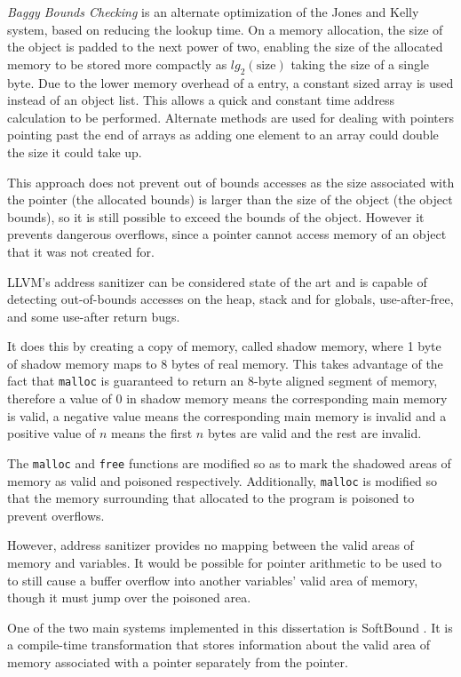 \textit{Baggy Bounds Checking} \cite{akritidis2009baggy} is an alternate optimization of the Jones and Kelly system, based on reducing the lookup time.
On a memory allocation, the size of the object is padded to the next power of two, enabling the size of the allocated memory to be stored more compactly as $lg_2(\mbox{size})$ taking the size of a single byte.
Due to the lower memory overhead of a entry, a constant sized array is used instead of an object list.
This allows a quick and constant time address calculation to be performed.
Alternate methods are used for dealing with pointers pointing past the end of arrays as adding one element to an array could double the size it could take up.

This approach does not prevent out of bounds accesses as the size associated with the pointer (the allocated bounds) is larger than the size of the object (the object bounds), so it is still possible to exceed the bounds of the object.
However it prevents dangerous overflows, since a pointer cannot access memory of an object that it was not created for.

LLVM's address sanitizer \cite{llvmAddrSan, llvmAddrSanAlgo} can be considered state of the art and  is capable of detecting out-of-bounds accesses on the heap, stack and for globals, use-after-free, and some use-after return bugs.

It does this by creating a copy of memory, called shadow memory, where 1 byte of shadow memory maps to 8 bytes of real memory.
This takes advantage of the fact that \verb!malloc! is guaranteed to return an 8-byte aligned segment of memory, therefore a value of 0 in shadow memory means the corresponding main memory is valid, a negative value means the corresponding main memory is invalid and a positive value of $n$ means the first $n$ bytes are valid and the rest are invalid.

The \verb!malloc! and \verb!free! functions are modified so as to mark the shadowed areas of memory as valid and poisoned respectively.
Additionally, \verb!malloc! is modified so that the memory surrounding that allocated to the program is poisoned to prevent overflows.

However, address sanitizer provides no mapping between the valid areas of memory and variables.
It would be possible for pointer arithmetic to be used to to still cause a buffer overflow into another variables' valid area of memory, though it must jump over the poisoned area.

One of the two main systems implemented in this dissertation is SoftBound \cite{nagarakatte2009softbound}.
It is a compile-time transformation that stores information about the valid area of memory associated with a pointer separately from the pointer.

